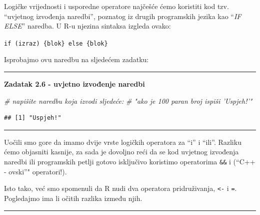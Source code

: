 \documentclass[]{book}
\newenvironment{Shaded}{\begin{snugshade}}{\end{snugshade}}
\newcommand{\KeywordTok}[1]{\textcolor[rgb]{0.13,0.29,0.53}{\textbf{#1}}}
\newcommand{\DecValTok}[1]{\textcolor[rgb]{0.00,0.00,0.81}{#1}}
\newcommand{\StringTok}[1]{\textcolor[rgb]{0.31,0.60,0.02}{#1}}
\newcommand{\CommentTok}[1]{\textcolor[rgb]{0.56,0.35,0.01}{\textit{#1}}}
\newcommand{\ControlFlowTok}[1]{\textcolor[rgb]{0.13,0.29,0.53}{\textbf{#1}}}
\newcommand{\OperatorTok}[1]{\textcolor[rgb]{0.81,0.36,0.00}{\textbf{#1}}}
\newcommand{\NormalTok}[1]{#1}
\theoremstyle{definition}
\theoremstyle{definition}
\theoremstyle{definition}
\theoremstyle{remark}
\begin{document}
Logičke vrijednosti i usporedne operatore najčešće ćemo koristiti kod
tzv. ``uvjetnog izvođenja naredbi'', poznatog iz drugih programskih
jezika kao ``\emph{IF ELSE}'' naredba. U R-u njezina sintaksa izgleda
ovako:

\texttt{if\ (izraz)\ \{blok\}\ else\ \{blok\}}

Isprobajmo ovu naredbu na sljedećem zadatku:

\begin{center}\rule{0.5\linewidth}{\linethickness}\end{center}

\textbf{Zadatak 2.6 - uvjetno izvođenje naredbi}

\begin{Shaded}
\begin{Highlighting}[]
\CommentTok{# napišite naredbu koja izvodi sljedeće:}
\CommentTok{# "ako je 100 paran broj ispiši 'Uspjeh!'"}
\end{Highlighting}
\end{Shaded}

\begin{Shaded}
\end{Shaded}

\begin{verbatim}
## [1] "Uspjeh!"
\end{verbatim}

\begin{center}\rule{0.5\linewidth}{\linethickness}\end{center}

Uočili smo gore da imamo dvije vrste logičkih operatora za ``i'' i
``ili''. Razliku ćemo objasniti kasnije, za sada je dovoljno reći da se
kod uvjetnog izvođenja naredbi ili programskih petlji gotovo isključivo
koristimo operatorima \texttt{\&\&} i \texttt{\textbar{}\textbar{}}
(``C++ - ovski''" operatori!).

Isto tako, već smo spomenuli da R nudi dva operatora pridruživanja,
\texttt{\textless{}-} i \texttt{=}. Pogledajmo ima li očitih razlika
između njih.

\begin{center}\rule{0.5\linewidth}{\linethickness}\end{center}
\end{document}
